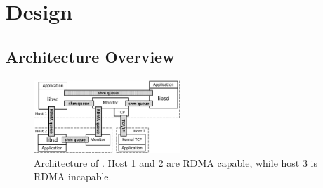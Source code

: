 \section{Design}
\label{sec:design}

\subsection{Architecture Overview}
\label{subsec:architecture}


\begin{figure}[t!]
	\centering
	\includegraphics[width=0.49\textwidth]{images/architecture_new}
	\vspace{-15pt}
	\caption{Architecture of \sys{}. Host 1 and 2 are RDMA capable, while host 3 is RDMA incapable.}
	\label{fig:architecture}
\end{figure}

